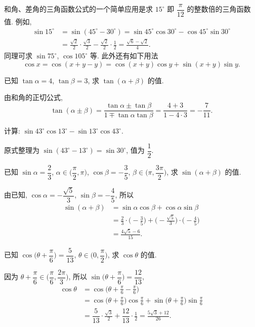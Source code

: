和角、差角的三角函数公式的一个简单应用是求 $15^\circ$ 即 $\dfrac{\pi}{12}$ 的整数倍的三角函数值.
例如, 
\begin{align*}
    \sin15^\circ
    &= \sin(45^\circ-30^\circ)
     = \sin45^\circ\cos30^\circ- \cos45^\circ\sin30^\circ \\
    &= \frac{\sqrt2}2\cdot\frac{\sqrt3}2- \frac{\sqrt2}2\cdot\frac12
     = \frac{\sqrt6-\sqrt2}4.
\end{align*}
同理可求 $\sin75^\circ$, $\cos105^\circ$ 等. 此外还有如下用法
\[\cos x= \cos(x+y-y)= \cos(x+y)\cos y+\sin(x+y)\sin y.\]

\lianxi
\begin{exercise}
    已知 $\tan \alpha=4$, $\tan \beta=3$, 求 $\tan(\alpha+\beta)$ 的值.
\end{exercise}
\beginsolution
    由和角的正切公式,
    \[\tan(\alpha\pm \beta)
    = \frac{\tan\alpha\pm \tan\beta}{1\mp \tan\alpha\tan\beta}
    = \frac{4+3}{1-4\cdot 3}= -\frac{7}{11}.\]
\endsolution

\begin{exercise}
    计算: $\sin43^\circ \cos13^\circ- \sin 13^\circ\cos 43^\circ$.
\end{exercise}
\beginsolution
    原式整理为 $\sin(43^\circ- 13^\circ)= \sin 30^\circ$, 值为 $\dfrac12$.
\endsolution

\begin{exercise}
    已知 $\sin\alpha= \dfrac23$, $\alpha\in\Big(\dfrac\pi2, \pi\Big)$, $\cos\beta=-\dfrac35$, $\beta\in\Big(\pi, \dfrac{3\pi}2\Big)$, 求 $\sin(\alpha+\beta)$ 的值.
\end{exercise}
\beginsolution
    由已知, $\cos\alpha= -\dfrac{\sqrt5}{3}$, $\sin\beta= -\dfrac45$, 所以
    \[\begin{aligned}
        \sin(\alpha+\beta)
        &= \sin\alpha\cos\beta+\cos\alpha\sin\beta\\
        &= \frac23\cdot\biggl(-\frac35\biggr)
            + \biggl(-\frac{\sqrt5}{3}\biggr)\cdot
              \biggl(-\frac45\biggr)\\
        &= \frac{4\sqrt5- 6}{15}.
    \end{aligned}\]
\endsolution

\begin{exercise}
    已知 $\cos\Big(\theta+ \dfrac\pi6\Big)= \dfrac5{13}$, $\theta\in\Big(0, \dfrac\pi2\Big)$, 求 $\cos\theta$ 的值.
\end{exercise}
\beginsolution
    因为 $\theta+ \dfrac{\pi}{6}\in\Big(\dfrac{\pi}{6}, \dfrac{2\pi}3\Big)$, 所以 $\sin\Big(\theta+ \dfrac\pi6\Big)= \dfrac{12}{13}$,
    \[\begin{aligned}
        \cos\theta
        &= \cos\biggl(\theta+ \frac\pi6- \frac\pi6\biggr)\\
        &= \cos\biggl(\theta+ \frac\pi6\biggr) \cos\frac\pi6
            + \sin\biggl(\theta+ \frac\pi6\biggr) \sin\frac\pi6\\
        &= \dfrac5{13}\cdot\frac{\sqrt3}{2}
            + \dfrac{12}{13}\cdot\frac12
         = \frac{5\sqrt3+12}{26}.
    \end{aligned}\]
\endsolution

